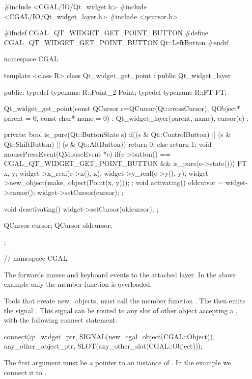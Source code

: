 \begin{ccExampleCode}
#include <CGAL/IO/Qt_widget.h>
#include <CGAL/IO/Qt_widget_layer.h>
#include <qcursor.h>

#ifndef CGAL_QT_WIDGET_GET_POINT_BUTTON
#define CGAL_QT_WIDGET_GET_POINT_BUTTON Qt::LeftButton
#endif

namespace CGAL {
template <class R>
class Qt_widget_get_point : public Qt_widget_layer
{
public:
  typedef typename R::Point_2   Point;
  typedef typename R::FT        FT;
  
  Qt_widget_get_point(const QCursor c=QCursor(Qt::crossCursor),
                      QObject* parent = 0, const char* name = 0) :
    Qt_widget_layer(parent, name), cursor(c) {};
  
private:
  bool is_pure(Qt::ButtonState s){
    if((s & Qt::ControlButton) ||
       (s & Qt::ShiftButton) ||
       (s & Qt::AltButton))
      return 0;
    else
      return 1;
  }
  void mousePressEvent(QMouseEvent *e)
  {
    if(e->button() == CGAL_QT_WIDGET_GET_POINT_BUTTON
       && is_pure(e->state()))
    {
      FT x, y;
      widget->x_real(e->x(), x);
      widget->y_real(e->y(), y);
      widget->new_object(make_object(Point(x, y)));
    }
  };
  void activating()
  {
    oldcursor = widget->cursor();
    widget->setCursor(cursor);
  };
  
  void deactivating()
  {
    widget->setCursor(oldcursor);
  };

  QCursor cursor;
  QCursor oldcursor;
};
} // namespace CGAL
\end{ccExampleCode}

The  forwards mouse and keyboard events to the attached layer.
In the above example only the  member function is overloaded.

Tools that create new \cgal\ objects, must call the member 
function . The
 then emits the signal
. This signal can be routed to
any slot of other object accepting a , with the
following connect statement:
\begin{ccExampleCode}
connect(qt_widget_ptr, SIGNAL(new_cgal_object(CGAL::Object)), 
        any_other_object_ptr, SLOT(any_other_slot(CGAL::Object)));
\end{ccExampleCode}

The first argument must be a pointer to an instance of .
In the example we connect it to .

